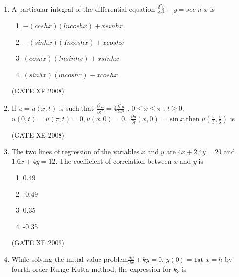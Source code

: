 \documentclass[12pt]{article}
\begin{document}
\begin{enumerate}
(GATE XE 2008)
\item  A particular integral of the differential equation {\large $\frac{d^2y}{dx^2} - y = sec$ $h$ $x$} is

\begin{enumerate}
\item $- (cosh x) (ln cosh x) + xsinhx$
\item $- (sinh x) (Incosh x) + xcosh x$
\item $(cosh x) (Insinh x) + xsinh x$
\item $(sinh x) (ln cosh x) - x cosh x$
\end{enumerate}

(GATE XE 2008)
\item If $u=u(x,t)$ is such that $\frac{\partial^2 u}{\partial t^2} = 4\frac{\partial^2 u}{\partial x^2}$ , $0\leq x \leq \pi$ , $t \geq 0$, \newline $u(0,t)=u(\pi , t)=0,$\newline $u(x,0)=0,$ \newline $\frac{\partial u}{\partial t}(x,0)=\sin{x}$,\newline then $u(\frac{\pi}{3}, \frac{\pi}{6})$ is

\begin{enumerate}
\end{enumerate}


(GATE XE 2008)
\item The two lines of regression of the variables $x$ and $y$ are
$4x+2.4y = 20$ and $1.6x +4y =12$.
The coefficient of correlation between $x$ and $y$ is

\begin{enumerate}
\item 0.49
\item -0.49
\item  0.35
\item -0.35
\end{enumerate}

(GATE XE 2008)
\item While solving the initial value problem\newline $\frac{dy}{dx}+ky=0$, $y(0)=1$\newline at $x = h$ by fourth order Runge-Kutta method, the expression for $k_3$ is


\end{enumerate}
\end{document}
